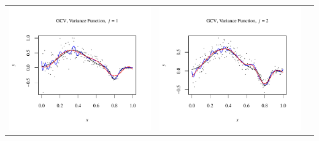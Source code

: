 \documentclass[11pt]{article}
\begin{document}
\begin{table}[h!]
  \begin{center}
    \renewcommand{\arraystretch}{1.5}
    \begin{tabular}{| >{\centering\arraybackslash}m{2.1in} |  >{\centering\arraybackslash}m{2.1in} |  >{\centering\arraybackslash}m{2.1in}|}
      \hline
      \includegraphics[width=1\linewidth,height=0.18\textheight]{Graphs/2/4/assignment5_a_2_4_1}&
      \includegraphics[width=1\linewidth,height=0.18\textheight]{Graphs/2/4/assignment5_a_2_4_2}&

\end{tabular}
\end{center}
\end{table}
\end{document}
